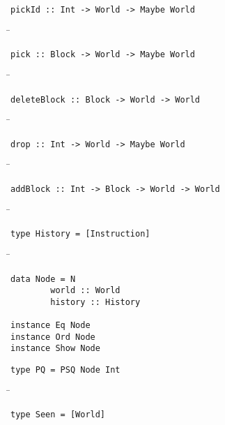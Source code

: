 \begin{verbatim}
pickId :: Int -> World -> Maybe World
\end{verbatim}
\begin{tabbing}
\hspace*{1cm}\= \kill
\> 
\end{tabbing}
\begin{verbatim}
pick :: Block -> World -> Maybe World
\end{verbatim}
\begin{tabbing}
\hspace*{1cm}\= \kill
\> 
\end{tabbing}
\begin{verbatim}
deleteBlock :: Block -> World -> World
\end{verbatim}
\begin{tabbing}
\hspace*{1cm}\= \kill
\> 
\end{tabbing}
\begin{verbatim}
drop :: Int -> World -> Maybe World
\end{verbatim}
\begin{tabbing}
\hspace*{1cm}\= \kill
\> 
\end{tabbing}
\begin{verbatim}
addBlock :: Int -> Block -> World -> World
\end{verbatim}
\begin{tabbing}
\hspace*{1cm}\= \kill
\> 
\end{tabbing}
\begin{verbatim}
type History = [Instruction]
\end{verbatim}
\begin{tabbing}
\hspace*{1cm}\= \kill
\> 
\end{tabbing}
\begin{verbatim}
data Node = N
        world :: World
        history :: History

instance Eq Node
instance Ord Node
instance Show Node
\end{verbatim}
\begin{verbatim}
type PQ = PSQ Node Int
\end{verbatim}
\begin{tabbing}
\hspace*{1cm}\= \kill
\> 
\end{tabbing}
\begin{verbatim}
type Seen = [World]
\end{verbatim}
